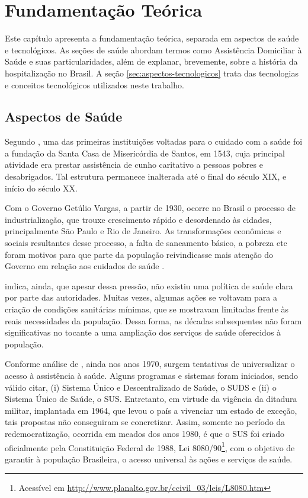 \chapter{Fundamentação Teórica}\label{cap:fundamentacao-teorica}

Este capítulo apresenta a fundamentação teórica, separada em aspectos de saúde e
tecnológicos. As seções de saúde abordam termos como Assistência Domiciliar à
Saúde e suas particularidades, além de explanar, brevemente, sobre a história da
hospitalização no Brasil. A seção \ref{sec:aspectos-tecnologicos} trata das
tecnologias e conceitos tecnológicos utilizados neste trabalho.

\section{Aspectos de Saúde}\label{sec:aspectos-de-saude}

Segundo , uma das primeiras instituições voltadas para o
cuidado com a saúde foi a fundação da Santa Casa de Misericórdia de Santos, em
1543, cuja principal atividade era prestar assistência de cunho caritativo a
pessoas pobres e desabrigados. Tal estrutura permanece inalterada até o final do
século XIX, e início do século XX.

Com o Governo Getúlio Vargas, a partir de 1930, ocorre no Brasil o processo de
industrialização, que trouxe crescimento rápido e desordenado às cidades,
principalmente São Paulo e Rio de Janeiro. As transformações econômicas e
sociais resultantes desse processo, a falta de saneamento básico, a pobreza etc
foram motivos para que parte da população reivindicasse mais atenção do Governo
em relação aos cuidados de saúde \cite{carvalho1984}.

 indica, ainda, que apesar dessa pressão, não existiu
uma política de saúde clara por parte das autoridades. Muitas vezes, algumas
ações se voltavam para a criação de condições sanitárias mínimas, que se
mostravam limitadas frente às reais necessidades da população. Dessa forma, as
décadas subsequentes não foram significativas no tocante a uma ampliação dos
serviços de saúde oferecidos à população.

Conforme análise de , ainda nos anos 1970, surgem
tentativas de universalizar o acesso à assistência à saúde. Alguns programas e
sistemas foram iniciados, sendo válido citar, (i) Sistema Único e
Descentralizado de Saúde, o SUDS e (ii) o Sistema Único de Saúde, o SUS.
Entretanto, em virtude da vigência da ditadura militar, implantada em 1964, que
levou o país a vivenciar um estado de exceção, tais propostas não conseguiram se
concretizar. Assim, somente no período da redemocratização, ocorrida em meados
dos anos 1980, é que o SUS foi criado oficialmente pela Constituição Federal de
1988, Lei 8080/90\footnote{ Acessível em
\url{http://www.planalto.gov.br/ccivil_03/leis/L8080.htm}}, com o  objetivo de
garantir à população Brasileira, o acesso universal às ações e  serviços de
saúde.


